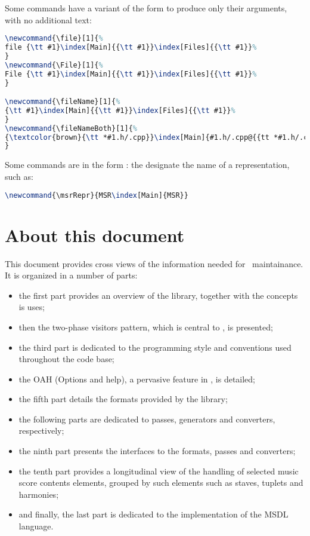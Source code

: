 Some commands have a variant of the form  to produce only their arguments, with no additional text:\begin{lstlisting}[language=Latex]
\newcommand{\file}[1]{%
file {\tt #1}\index[Main]{{\tt #1}}\index[Files]{{\tt #1}}%
}
\newcommand{\File}[1]{%
File {\tt #1}\index[Main]{{\tt #1}}\index[Files]{{\tt #1}}%
}

\newcommand{\fileName}[1]{%
{\tt #1}\index[Main]{{\tt #1}}\index[Files]{{\tt #1}}%
}
\newcommand{\fileNameBoth}[1]{%
{\textcolor{brown}{\tt *#1.h/.cpp}}\index[Main]{#1.h/.cpp@{{tt *#1.h/.cpp}}}\index[Files]{#1.h/.cpp@{{tt *#1.h/.cpp}}}%
}
\end{lstlisting}

Some commands are in the form  : the designate the name of a representation, such as:
\begin{lstlisting}[language=Latex]
\newcommand{\msrRepr}{MSR\index[Main]{MSR}}
\end{lstlisting}


\section{About this document}

This document provides cross views of the information needed for \mf\ maintainance. It is organized in a number of parts:
\begin{itemize}
\item the first part provides an overview of the library, together with the concepts is uses;
\item then the two-phase visitors pattern, which is central to \mf, is presented;
\item the third part is dedicated to the programming style and conventions used throughout the code base;
\item the OAH (Options and help), a pervasive feature in \mf, is detailed;
\item the fifth part details the formats provided by the library;
\item the following parts are dedicated to passes, generators and converters, respectively;
\item the ninth part presents the interfaces to the formats, passes and converters;
\item the tenth part provides a longitudinal view of the handling of selected music score contents elements, grouped by such elements such as staves, tuplets and harmonies;
\item and finally, the last part is dedicated to the implementation of the MSDL language.
\end{itemize}


